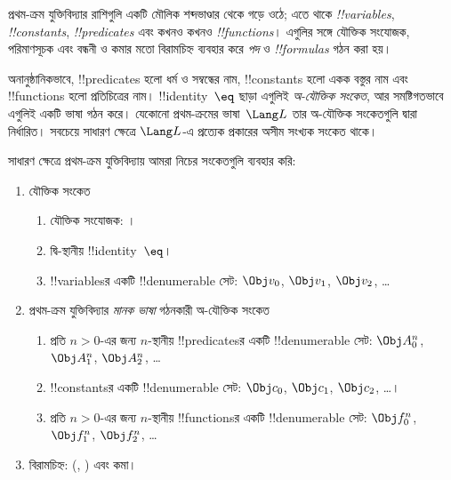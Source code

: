 \documentclass[../../../include/open-logic-section]{subfiles}
\begin{document}



প্রথম-ক্রম যুক্তিবিদ্যার রাশিগুলি একটি মৌলিক শব্দভাণ্ডার থেকে গড়ে ওঠে;
এতে থাকে \emph{!!{variable}s}, \emph{!!{constant}s},
\emph{!!{predicate}s} এবং কখনও কখনও \emph{!!{function}s}। এগুলির
সঙ্গে যৌক্তিক সংযোজক, পরিমাণসূচক এবং বন্ধনী ও কমার মতো বিরামচিহ্ন
ব্যবহার করে \emph{পদ} ও \emph{!!{formula}s} গঠন করা হয়।

\begin{explain}
অনানুষ্ঠানিকভাবে, !!{predicate}s হলো ধর্ম ও সম্বন্ধের নাম,
!!{constant}s হলো একক বস্তুর নাম এবং !!{function}s হলো প্রতিচিত্রের
নাম। !!{identity}~$\eq$ ছাড়া এগুলিই \emph{অ-যৌক্তিক সংকেত}, আর
সমষ্টিগতভাবে এগুলিই একটি ভাষা গঠন করে। যেকোনো প্রথম-ক্রমের ভাষা~$\Lang
L$ তার অ-যৌক্তিক সংকেতগুলি দ্বারা নির্ধারিত। সবচেয়ে সাধারণ ক্ষেত্রে
$\Lang L$-এ প্রত্যেক প্রকারের অসীম সংখ্যক সংকেত থাকে।
\end{explain}

সাধারণ ক্ষেত্রে প্রথম-ক্রম যুক্তিবিদ্যায় আমরা নিচের সংকেতগুলি ব্যবহার
করি:

\begin{enumerate}
\item যৌক্তিক সংকেত
\begin{enumerate}
\item যৌক্তিক সংযোজক:
  \startycommalist
  ।
\item দ্বি-স্থানীয় !!{identity}~$\eq$।
\item !!{variable}sর একটি !!{denumerable} সেট: $\Obj v_0$, $\Obj v_1$, $\Obj
  v_2$, \dots
\end{enumerate}
\item প্রথম-ক্রম যুক্তিবিদ্যার \emph{মানক ভাষা} গঠনকারী অ-যৌক্তিক
  সংকেত
\begin{enumerate}
\item প্রতি $n>0$-এর জন্য $n$-স্থানীয় !!{predicate}sর একটি
  !!{denumerable} সেট: $\Obj A^n_0$, $\Obj A^n_1$, $\Obj A^n_2$, \dots
\item !!{constant}sর একটি !!{denumerable} সেট: $\Obj c_0$, $\Obj c_1$, $\Obj
  c_2$, \dots।
\item প্রতি $n>0$-এর জন্য $n$-স্থানীয় !!{function}sর একটি
  !!{denumerable} সেট:
  $\Obj f^n_0$, $\Obj f^n_1$, $\Obj f^n_2$, \dots
\end{enumerate}
\item বিরামচিহ্ন: (, ) এবং কমা।
\end{enumerate}
\end{document}

